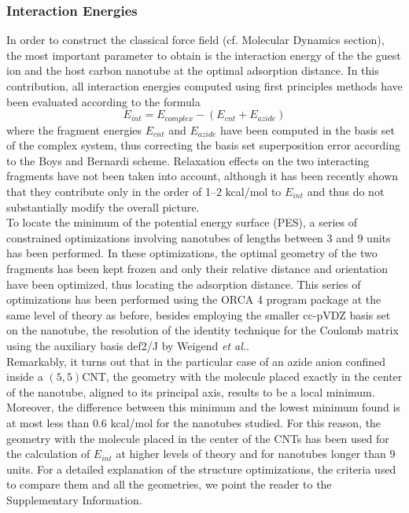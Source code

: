 \documentclass[utf8]{article}
\begin{document}
\subsubsection{Interaction Energies}
In order to construct the classical force field (cf. Molecular Dynamics section), the most important parameter to obtain is the interaction energy of the the guest \ntm ion and the host carbon nanotube at the optimal adsorption distance.
In this contribution, all interaction energies computed using first principles methods have been evaluated according to the formula
%
\begin{equation}
    E_{int} = E_{complex} - (E_{cnt} + E_{azide}) \label{eq:eint}
\end{equation}
%
where the fragment energies $E_{cnt}$ and $E_{azide}$ have been computed in the basis set of the complex system, thus correcting the basis set superposition error according to the Boys and Bernardi scheme\cite{Boys1970}.
Relaxation effects on the two interacting fragments have not been taken into account, although it has been recently shown that they contribute only in the order of 1--2 kcal/mol\cite{Battaglia2017a} to $E_{int}$ and thus do not substantially modify the overall picture.\\
To locate the minimum of the potential energy surface (PES), a series of constrained optimizations involving nanotubes of lengths between 3 and 9 units has been performed. In these optimizations, the optimal geometry of the two fragments has been kept frozen and only their relative distance and orientation have been optimized, thus locating the adsorption distance.
This series of optimizations has been performed using the ORCA 4 program package\cite{ORCA} at the same level of theory as before, besides employing the smaller cc-pVDZ basis set on the nanotube, the resolution of the identity technique for the Coulomb matrix using the auxiliary basis def2/J by Weigend \textit{et al.}\cite{Weigend2006}.\\
Remarkably, it turns out that in the particular case of an azide anion confined inside a $(5,5)$CNT, the geometry with the \ntm molecule placed exactly in the center of the nanotube, aligned to its principal axis, results to be a local minimum. Moreover, the difference between this minimum and the lowest minimum found is at most less than $0.6$ kcal/mol for the nanotubes studied. For this reason, the geometry with the \ntm molecule placed in the center of the CNTs has been used for the calculation of $E_{int}$ at higher levels of theory and for nanotubes longer than 9 units.
For a detailed explanation of the structure optimizations, the criteria used to compare them and all the geometries, we point the reader to the Supplementary Information.\\
\end{document}
